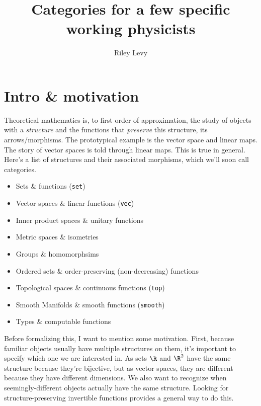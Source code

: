 \documentclass[a5paper]{scrartcl}
\title{\normalfont \color{darkgray}Categories for a few specific working physicists}
\author{Riley Levy}
\def\topcat{\texttt{top}}
\def\setcat{\texttt{set}}
\def\veccat{\texttt{vec}}
\def\smooth{\texttt{smooth}}
\begin{document}
\maketitle
\section{Intro \& motivation}
Theoretical mathematics is, to first order of approximation, the study of objects with a \emph{structure} and the functions that \emph{preserve} this structure, its arrows/morphisms. The prototypical example is the vector space and linear maps. The story of vector spaces is told through linear maps. This is true in general. Here's a list of structures and their associated morphisms, which we'll soon call categories.
\begin{itemize}
  \item Sets \& functions (\setcat)
  \item Vector spaces \& linear functions (\veccat)
  \item Inner product spaces \& unitary functions
  \item Metric spaces \& isometries
  \item Groups \& homomorphsims
  \item Ordered sets \& order-preserving (non-decreasing) functions
  \item Topological spaces \& continuous functions (\topcat)
  \item Smooth Manifolds \& smooth functions (\smooth)
  \item Types \& computable functions
\end{itemize}

Before formalizing this, I want to mention some motivation. First, because familiar objects usually have multiple structures on them, it's important to specify which one we are interested in. As sets \(\R\) and \(\R^2\) have the same structure because they're bijective, but as vector spaces, they are different because they have different dimensions. We also want to recognize when seemingly-different objects actually have the same structure. Looking for structure-preserving invertible functions provides a general way to do this.
\end{document}

